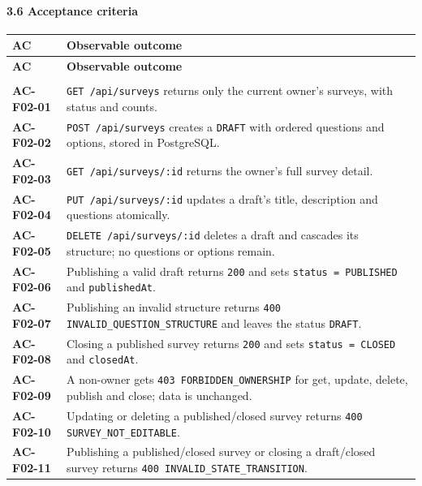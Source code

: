 \documentclass[12pt,a4paper]{article}
\begin{document}
\paragraph*{3.6 Acceptance criteria}
{\setlength{\tabcolsep}{3pt}\renewcommand{\arraystretch}{1.08}\small
\begin{longtable}{@{}>{\raggedright\arraybackslash}p{}>{\raggedright\arraybackslash}p{}@{}}
\toprule
\textbf{AC} & \textbf{Observable outcome} \\
\midrule
\endfirsthead
\toprule
\textbf{AC} & \textbf{Observable outcome} \\
\midrule
\endhead
\midrule
\multicolumn{2}{r}{\footnotesize\textit{Continued on next page}}\\
\endfoot
\bottomrule
\endlastfoot
\textbf{AC-F02-01} & \texttt{GET /api/surveys} returns only the current owner's surveys, with status and counts. \\
\textbf{AC-F02-02} & \texttt{POST /api/surveys} creates a \texttt{DRAFT} with ordered questions and options, stored in PostgreSQL. \\
\textbf{AC-F02-03} & \texttt{GET /api/surveys/:id} returns the owner's full survey detail. \\
\textbf{AC-F02-04} & \texttt{PUT /api/surveys/:id} updates a draft's title, description and questions atomically. \\
\textbf{AC-F02-05} & \texttt{DELETE /api/surveys/:id} deletes a draft and cascades its structure; no questions or options remain. \\
\textbf{AC-F02-06} & Publishing a valid draft returns \texttt{200} and sets \texttt{status = PUBLISHED} and \texttt{publishedAt}. \\
\textbf{AC-F02-07} & Publishing an invalid structure returns \texttt{400 INVALID\_QUESTION\_STRUCTURE} and leaves the status \texttt{DRAFT}. \\
\textbf{AC-F02-08} & Closing a published survey returns \texttt{200} and sets \texttt{status = CLOSED} and \texttt{closedAt}. \\
\textbf{AC-F02-09} & A non-owner gets \texttt{403 FORBIDDEN\_OWNERSHIP} for get, update, delete, publish and close; data is unchanged. \\
\textbf{AC-F02-10} & Updating or deleting a published/closed survey returns \texttt{400 SURVEY\_NOT\_EDITABLE}. \\
\textbf{AC-F02-11} & Publishing a published/closed survey or closing a draft/closed survey returns \texttt{400 INVALID\_STATE\_TRANSITION}. \\
\end{longtable}}
\end{document}
